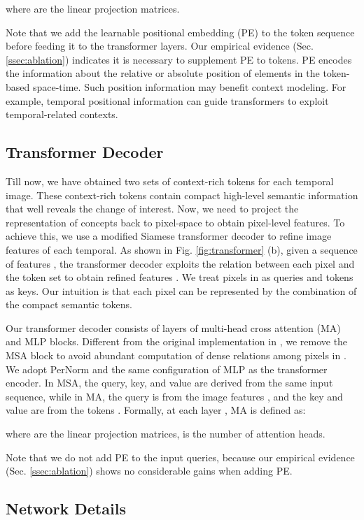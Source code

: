 \documentclass[journal]{IEEEtran}
\begin{document}
where  are the linear projection matrices.

Note that we add the learnable positional embedding (PE)  to the token sequence  before feeding it to the transformer layers. Our empirical evidence (Sec. \ref{ssec:ablation}) indicates it is necessary to supplement PE to tokens. PE encodes the information about the relative or absolute position of elements in the token-based space-time. Such position information may benefit context modeling. For example, temporal positional information can guide transformers to exploit temporal-related contexts.


\subsection{Transformer Decoder}
\label{ssec:transformer_decoder}
Till now, we have obtained two sets of context-rich tokens  for each temporal image. These context-rich tokens contain compact high-level semantic information that well reveals the change of interest. Now, we need to project the representation of concepts back to pixel-space to obtain pixel-level features. To achieve this, we use a modified Siamese transformer decoder \cite{Vaswani2017} to refine image features of each temporal. As shown in Fig. \ref{fig:transformer} (b), given a sequence of features , the transformer decoder exploits the relation between each pixel and the token set  to obtain refined features . We treat pixels in  as queries and tokens as keys. Our intuition is that each pixel can be represented by the combination of the compact semantic tokens. 


Our transformer decoder consists of  layers of multi-head cross attention (MA) and MLP blocks. Different from the original implementation in \cite{Vaswani2017}, we remove the MSA block to avoid abundant computation of dense relations among pixels in . We adopt PerNorm and the same configuration of MLP as the transformer encoder. In MSA, the query, key, and value are derived from the same input sequence, while in MA, the query is from the image features , and the key and value are from the tokens . Formally, at each layer , MA is defined as:

where  are the linear projection matrices,  is the number of attention heads.

Note that we do not add PE to the input queries, because our empirical evidence (Sec. \ref{ssec:ablation}) shows no considerable gains when adding PE. 

\subsection{Network Details}
\label{ssec:network_details}
\end{document}
